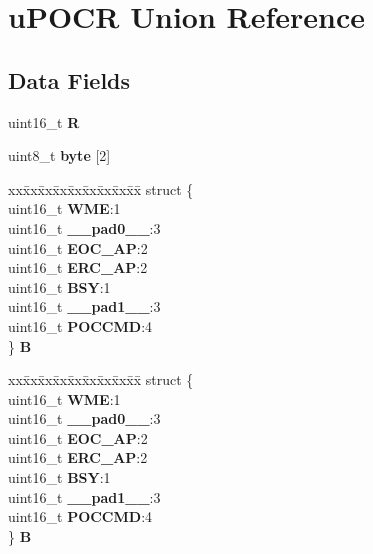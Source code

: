 \hypertarget{unionuPOCR}{}\section{u\+P\+O\+CR Union Reference}
\label{unionuPOCR}
\subsection*{Data Fields}
\begin{DoxyCompactItemize}
\item 
\mbox{\label{unionuPOCR_ae44e5bfe520e85a69cda01b53216fac4}} 
uint16\+\_\+t {\bfseries R}
\item 
\mbox{\label{unionuPOCR_a1a7f4fd7b3154a7aa3b7c585c34ee172}} 
uint8\+\_\+t {\bfseries byte} \mbox{[}2\mbox{]}
\item 
\mbox{\label{unionuPOCR_af8f664eae80959fa3c20ef024d0e97ff}} 
\begin{tabbing}
xx\=xx\=xx\=xx\=xx\=xx\=xx\=xx\=xx\=\kill
struct \{\\
\>uint16\_t {\bfseries WME}:1\\
\>uint16\_t {\bfseries \_\_pad0\_\_}:3\\
\>uint16\_t {\bfseries EOC\_AP}:2\\
\>uint16\_t {\bfseries ERC\_AP}:2\\
\>uint16\_t {\bfseries BSY}:1\\
\>uint16\_t {\bfseries \_\_pad1\_\_}:3\\
\>uint16\_t {\bfseries POCCMD}:4\\
\} {\bfseries B}\\

\end{tabbing}\item 
\mbox{\label{unionuPOCR_a12807f38335efcf01f9994f61a8283e9}} 
\begin{tabbing}
xx\=xx\=xx\=xx\=xx\=xx\=xx\=xx\=xx\=\kill
struct \{\\
\>uint16\_t {\bfseries WME}:1\\
\>uint16\_t {\bfseries \_\_pad0\_\_}:3\\
\>uint16\_t {\bfseries EOC\_AP}:2\\
\>uint16\_t {\bfseries ERC\_AP}:2\\
\>uint16\_t {\bfseries BSY}:1\\
\>uint16\_t {\bfseries \_\_pad1\_\_}:3\\
\>uint16\_t {\bfseries POCCMD}:4\\
\} {\bfseries B}\\


\end{tabbing}
\end{DoxyCompactItemize}
